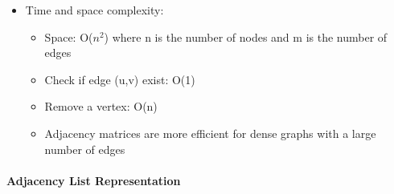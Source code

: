 \documentclass[10pt]{article}
\begin{document}
\begin{itemize}
\begin{itemize}
          \end{itemize}
    \item Time and space complexity:
          \begin{itemize}
              \item Space: O($n^2$) where n is the number of nodes and m is the number of edges
              \item Check if edge (u,v) exist: O(1)
              \item Remove a vertex: O(n)
              \item Adjacency matrices are more efficient for dense graphs with a large number of edges
          \end{itemize}
\end{itemize}
\paragraph{Adjacency List Representation}
\end{document}
